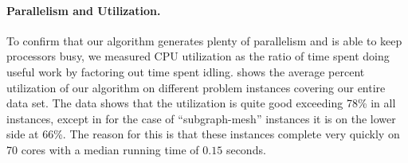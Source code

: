 
\paragraph{Parallelism and Utilization.}  
%
To confirm that our algorithm generates plenty of parallelism and is
able to keep processors busy, we measured CPU utilization as the ratio
of time spent doing useful work by factoring out time spent idling.
%
 shows the average
percent utilization of our algorithm on different problem instances
covering our entire data set.
%
The data shows that the utilization is quite good exceeding 78\% in
all instances, except in for the case of ``subgraph-mesh'' instances
it is on the lower side at 66\%.
%
The reason for this is that these instances complete very quickly on
70 cores with a median running time of $0.15$ seconds.





